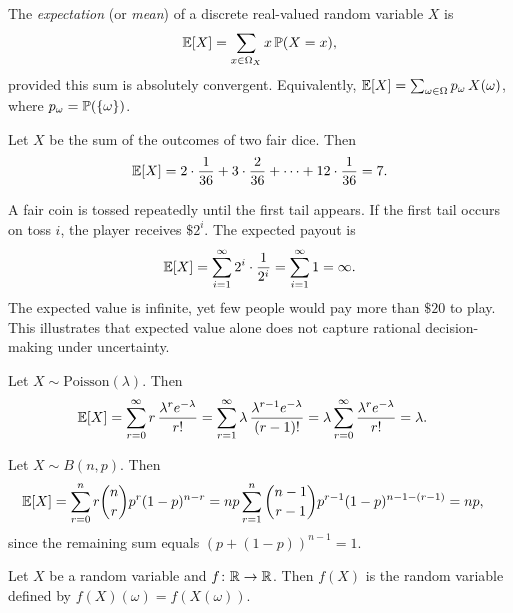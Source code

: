 \documentclass[a4paper]{article}
\begin{document}
\begin{defi}[Expectation]
  The \emph{expectation} (or \emph{mean}) of a discrete real-valued random variable $X$ is
  \[
    \E[X] = \sum_{x\in \Omega_X}x\,\P(X = x),
  \]
  provided this sum is absolutely convergent. Equivalently, $\E[X] = \sum_{\omega\in \Omega}p_\omega\, X(\omega)$, where $p_\omega = \P(\{\omega\})$.
\end{defi}

\begin{eg}
  Let $X$ be the sum of the outcomes of two fair dice. Then
  \[
    \E[X] = 2\cdot \frac{1}{36} + 3\cdot \frac{2}{36} + \cdots + 12\cdot \frac{1}{36} = 7.
  \]
\end{eg}

\begin{eg}
  A fair coin is tossed repeatedly until the first tail appears. If the first tail occurs on toss $i$, the player receives $\$2^i$. The expected payout is
  \[
    \E[X] = \sum_{i=1}^{\infty} 2^i \cdot \frac{1}{2^i} = \sum_{i=1}^{\infty} 1 = \infty.
  \]
  The expected value is infinite, yet few people would pay more than $\$20$ to play. This illustrates that expected value alone does not capture rational decision-making under uncertainty.
\end{eg}

\begin{eg}
  Let $X\sim \mathrm{Poisson}(\lambda)$. Then
  \begin{align*}
    \E[X] &= \sum_{r = 0}^\infty r\,\frac{\lambda^r e^{-\lambda}}{r!} = \sum_{r = 1}^\infty \lambda\, \frac{\lambda^{r - 1}e^{-\lambda}}{(r - 1)!} = \lambda\sum_{r = 0}^\infty\frac{\lambda^r e^{-\lambda}}{r!} = \lambda.
  \end{align*}
\end{eg}

\begin{eg}
  Let $X\sim B(n, p)$. Then
  \begin{align*}
    \E[X] &= \sum_{r=0}^n r\binom{n}{r} p^r(1 - p)^{n - r} = np\sum_{r = 1}^n \binom{n - 1}{r-1}p^{r - 1}(1 - p)^{n - 1 - (r - 1)} = np,
  \end{align*}
  since the remaining sum equals $(p + (1-p))^{n-1} = 1$.
\end{eg}

\begin{defi}
  Let $X$ be a random variable and $f\colon \R \to \R$. Then $f(X)$ is the random variable defined by $f(X)(\omega) = f(X(\omega))$.
\end{defi}
\end{document}
